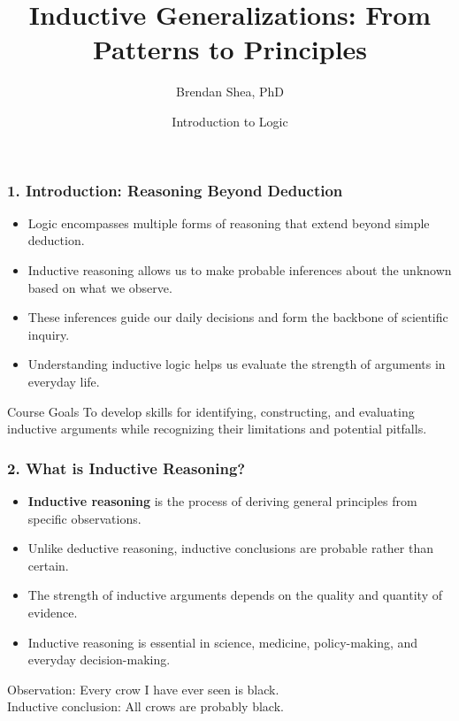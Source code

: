 \documentclass{beamer}
\title{Inductive Generalizations: From Patterns to Principles}
\date{Introduction to Logic}
\author{Brendan Shea, PhD}
\begin{document}
\begin{frame}
\titlepage
\end{frame}

\begin{frame}
\frametitle{1. Introduction: Reasoning Beyond Deduction}
\begin{itemize}
\item Logic encompasses multiple forms of reasoning that extend beyond simple deduction.
\item Inductive reasoning allows us to make probable inferences about the unknown based on what we observe.
\item These inferences guide our daily decisions and form the backbone of scientific inquiry.
\item Understanding inductive logic helps us evaluate the strength of arguments in everyday life.
\end{itemize}

\begin{block}{Course Goals}
To develop skills for identifying, constructing, and evaluating inductive arguments while recognizing their limitations and potential pitfalls.
\end{block}
\end{frame}

\begin{frame}
\frametitle{2. What is Inductive Reasoning?}
\begin{itemize}
\item \textbf{Inductive reasoning} is the process of deriving general principles from specific observations.
\item Unlike deductive reasoning, inductive conclusions are probable rather than certain.
\item The strength of inductive arguments depends on the quality and quantity of evidence.
\item Inductive reasoning is essential in science, medicine, policy-making, and everyday decision-making.
\end{itemize}

\begin{example}
Observation: Every crow I have ever seen is black.\\
Inductive conclusion: All crows are probably black.
\end{example}
\end{frame}
\end{document}
